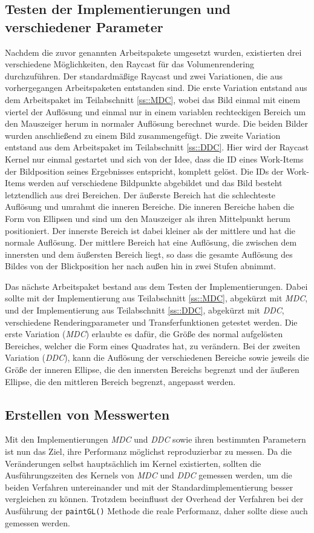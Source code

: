 \subsection{Testen der Implementierungen und verschiedener Parameter}
Nachdem die zuvor genannten Arbeitspakete umgesetzt wurden, existierten drei verschiedene Möglichkeiten, den Raycast für das Volumenrendering durchzuführen.
Der standardmäßige Raycast und zwei Variationen, die aus vorhergegangen Arbeitspaketen entstanden sind.
Die erste Variation entstand aus dem Arbeitspaket im Teilabschnitt \ref{ss::MDC}, wobei das Bild einmal mit einem viertel der Auflösung und einmal nur in einem variablen rechteckigen Bereich um den Mauszeiger herum in normaler Auflösung berechnet wurde.
Die beiden Bilder wurden anschließend zu einem Bild zusammengefügt.
Die zweite Variation entstand aus dem Arbeitspaket im Teilabschnitt \ref{ss::DDC}.
Hier wird der Raycast Kernel nur einmal gestartet und sich von der Idee, dass die ID eines Work-Items der Bildposition seines Ergebnisses entspricht, komplett gelöst.
Die IDs der Work-Items werden auf verschiedene Bildpunkte abgebildet und das Bild besteht letztendlich aus drei Bereichen.
Der äußerste Bereich hat die schlechteste Auflösung und umrahmt die inneren Bereiche.
Die inneren Bereiche haben die Form von Ellipsen und sind um den Mauszeiger als ihren Mittelpunkt herum positioniert.
Der innerste Bereich ist dabei kleiner als der mittlere und hat die normale Auflösung.
Der mittlere Bereich hat eine Auflösung, die zwischen dem innersten und dem äußersten Bereich liegt, so dass die gesamte Auflösung des Bildes von der Blickposition her nach außen hin in zwei Stufen abnimmt.

Das nächste Arbeitspaket bestand aus dem Testen der Implementierungen.
Dabei sollte mit der Implementierung aus Teilabschnitt \ref{ss::MDC}, abgekürzt mit \emph{MDC}, und der Implementierung aus Teilabschnitt \ref{ss::DDC}, abgekürzt mit \emph{DDC}, verschiedene Renderingparameter und Transferfunktionen getestet werden.
Die erste Variation (\emph{MDC}) erlaubte es dafür, die Größe des normal aufgelösten Bereiches, welcher die Form eines Quadrates hat, zu verändern.
Bei der zweiten Variation (\emph{DDC}), kann die Auflösung der verschiedenen Bereiche sowie jeweils die Größe der inneren Ellipse, die den innersten Bereichs begrenzt und der äußeren Ellipse, die den mittleren Bereich begrenzt, angepasst werden.

\subsection{Erstellen von Messwerten}\label{sec::workpacks::evm}
Mit den Implementierungen \emph{MDC} und \emph{DDC} sowie ihren bestimmten Parametern ist nun das Ziel, ihre Performanz möglichst reproduzierbar zu messen. Da die Veränderungen selbst hauptsächlich im Kernel existierten, sollten die Ausführungszeiten des Kernels von \emph{MDC} und \emph{DDC} gemessen werden, um die beiden Verfahren untereinander und mit der Standardimplementierung besser vergleichen zu können.
Trotzdem beeinflusst der Overhead der Verfahren bei der Ausführung der \texttt{paintGL()} Methode die reale Performanz, daher sollte diese auch gemessen werden.

